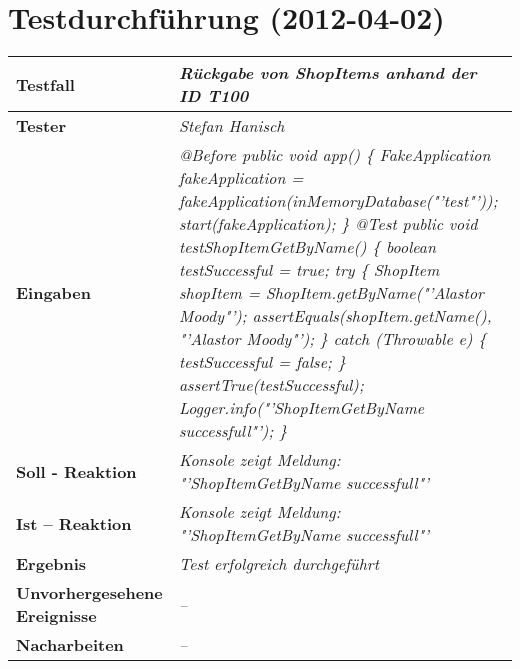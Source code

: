 
\chapter{Testdurchführung (2012-04-02)}



\begin{longtable}{|p{4cm}|p{11cm}|}
\hline
\textbf{Testfall} & \textit{Rückgabe von ShopItems anhand der ID \textbf{T100}} \\
\hline
\textbf{Tester} & \textit{Stefan Hanisch} \\
\hline
\textbf{Eingaben} & \textit{@Before \newline
public void app() \{ \newline
\hspace*{1mm}FakeApplication fakeApplication \newline
\hspace*{4mm}= fakeApplication(inMemoryDatabase("'test"'));\newline
\hspace*{1mm}start(fakeApplication); \newline
\} \newline
\newline
@Test \newline
public void testShopItemGetByName() \{\newline
\hspace*{1mm}boolean testSuccessful = true; \newline
\hspace*{1mm}try \{\newline
\hspace*{3mm}ShopItem shopItem = ShopItem.getByName("'Alastor Moody"');\newline
\hspace*{3mm}assertEquals(shopItem.getName(), "'Alastor Moody"');\newline
\hspace*{1mm}\} catch (Throwable e) \{ \newline
\hspace*{3mm}testSuccessful = false; \newline 
\hspace*{1mm}\} \newline
\hspace*{1mm}assertTrue(testSuccessful);\newline
\hspace*{1mm}Logger.info("'ShopItemGetByName successfull"');\newline
\}
} \\
\hline
\textbf{Soll - Reaktion} & \textit{Konsole zeigt Meldung: "'ShopItemGetByName successfull"'
} \\
\hline
\textbf{Ist -- Reaktion} & \textit{Konsole zeigt Meldung: "'ShopItemGetByName successfull"'} \\
\hline
\textbf{Ergebnis} & \textit{Test erfolgreich durchgeführt} \\
\hline
\textbf{Unvorhergesehene Ereignisse} &
\textit{--} \\
\hline
\textbf{Nacharbeiten } & \textit{--} \\
\hline
\end{longtable}
